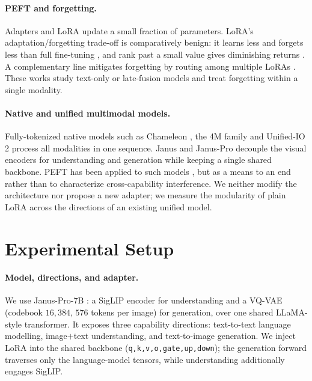 \documentclass{article}
\begin{document}
\paragraph{PEFT and forgetting.}
Adapters \citep{houlsby2019parameter} and LoRA \citep{hu2022lora} update a small
fraction of parameters. LoRA's adaptation/forgetting trade-off is comparatively
benign: it learns less and forgets less than full fine-tuning
\citep{biderman2024lora}, and rank past a small value gives diminishing returns
\citep{zhang2024scalingmeetsfinetuning}. A complementary line mitigates forgetting
by routing among multiple LoRAs \citep{dou2024loramoe,wu2024mole,li2024mixlora}.
These works study text-only or late-fusion models and treat forgetting within a
single modality.

\paragraph{Native and unified multimodal models.}
Fully-tokenized native models such as Chameleon \citep{chameleon2024}, the 4M
family \citep{bachmann20244m21} and Unified-IO\,2 \citep{lu2024unifiedio2} process
all modalities in one sequence. Janus and Janus-Pro \citep{wu2024janus,januspro}
decouple the visual encoders for understanding and generation while keeping a
single shared backbone. PEFT has been applied to such models
\citep{chern2024anole,serra2024narrowgate,wang2025vora}, but as a means to an end
rather than to characterize cross-capability interference. We neither modify the
architecture nor propose a new adapter; we measure the modularity of plain LoRA
across the directions of an existing unified model.

\section{Experimental Setup}
\paragraph{Model, directions, and adapter.}
We use Janus-Pro-7B \citep{januspro}: a SigLIP encoder for understanding and a
VQ-VAE (codebook $16{,}384$, $576$ tokens per image) for generation, over one
shared LLaMA-style transformer. It exposes three capability directions:
text-to-text language modelling, image$+$text understanding, and text-to-image
generation. We inject LoRA into the shared backbone
(\texttt{q,k,v,o,gate,up,down}); the generation forward traverses only the
language-model tensors, while understanding additionally engages SigLIP.
\end{document}

